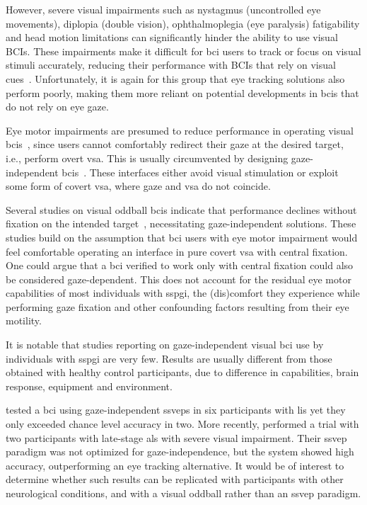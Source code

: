 \documentclass{article}
\begin{document}
However, severe visual impairments such as nystagmus (uncontrolled eye movements), diplopia (double
vision), ophthalmoplegia (eye paralysis) fatigability and head motion
limitations can significantly hinder the ability to use visual BCIs.
These impairments make it difficult for
\ac{bci} users to track or focus on visual stimuli accurately, reducing their
performance with BCIs that rely on visual cues~\cite{McCane2014,FriedOken2020,Pasqualotto2015}.
Unfortunately, it is again for this group that eye tracking solutions also
perform poorly, making them more reliant on potential developments in \acp{bci}
that do not rely on eye gaze.

Eye motor impairments are presumed to reduce performance in operating visual
\acp{bci}~\cite{VanDenKerchove2024a}, since users
cannot comfortably redirect their gaze at the desired target,
i.e., perform overt \ac{vsa}.
This is usually circumvented by designing gaze-independent \acp{bci}~\cite{Riccio2012}.
These interfaces either avoid visual stimulation or exploit some form of
covert \ac{vsa}, where gaze and \ac{vsa} do not coincide.

Several studies on visual oddball \acp{bci} indicate that performance declines
without fixation on the intended target~\cite{Brunner2010, Treder2010, RonAngevin2019},
necessitating gaze-independent solutions.
These studies build on the assumption that \ac{bci} users with eye motor
impairment would feel comfortable operating an interface in pure covert \ac{vsa} with
central fixation.
One could argue that a \ac{bci} verified to work only with central fixation could
also be considered gaze-dependent.
This does not account for the residual eye motor capabilities of most individuals
with \ac{sspgi}, the (dis)comfort they experience while performing gaze fixation
and other confounding factors resulting from their eye
motility.

It is notable that studies reporting on
gaze-independent visual \ac{bci} use by individuals with \ac{sspgi} are very few.
Results are usually different from those obtained with healthy control
participants, due to difference in capabilities, brain
response, equipment and environment.

\textcite{Lesenfants2014} tested a \ac{bci} using gaze-independent \acp{ssvep} in six
participants with \ac{lis} yet they only exceeded chance level accuracy in two.
More recently, \textcite{Peters2020} performed a trial with two
participants with late-stage \ac{als} with severe visual impairment.
Their \ac{ssvep} paradigm was not optimized for gaze-independence, but the
system showed high accuracy, outperforming an eye tracking alternative.
It would be of interest to determine whether such results can be replicated with
participants with other neurological conditions, and with a visual oddball rather
than an \ac{ssvep} paradigm.
\end{document}
